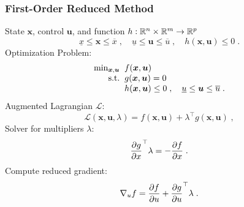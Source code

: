 \begin{frame}
  \frametitle{First-Order Reduced Method}
  State $\bm{x}$, control $\bm{u}$, and function $h: \REAL^{n} \times \REAL^{m} \to \REAL^{p}$
  \begin{equation}
    \underline{x} \leq \bm{x} \leq \overline{x} \;, \quad
    \underline{u} \leq \bm{u} \leq \overline{u} \;, \quad
    h(\bm{x}, \bm{u}) \leq 0 \;.
  \end{equation}
  Optimization Problem:
  \begin{equation}\label{eq:globalproblem}
    \begin{array}{r@{\;\;}l}
      \min_{\bm{x}, \bm{u}} & f(\bm{x}, \bm{u}) \\
      \text{s.t.} & g(\bm{x}, \bm{u}) = 0 \\
                  & h(\bm{x}, \bm{u}) \leq 0 \;,
                  \quad \underline{u} \leq \bm{u} \leq \overline{u}  \;.
    \end{array}
  \end{equation}
  Augmented Lagrangian $\mathcal{L}$:
  \begin{equation}
    \mathcal{L}(\bm{x}, \bm{u}, \lambda) = f(\bm{x}, \bm{u}) + \lambda^\top g(\bm{x}, \bm{u}) \; ,
  \end{equation}
  Solver for multipliers $\lambda$:
  \begin{equation}
    \dpart{g}{x}^\top \lambda = -\dpart{f}{x}  \; .
  \end{equation}
  Compute reduced gradient:
  \begin{equation}
    \grad{f}{u} = \dpart{f}{u} + \dpart{g}{u}^\top\lambda \; .
  \end{equation}

\end{frame}


